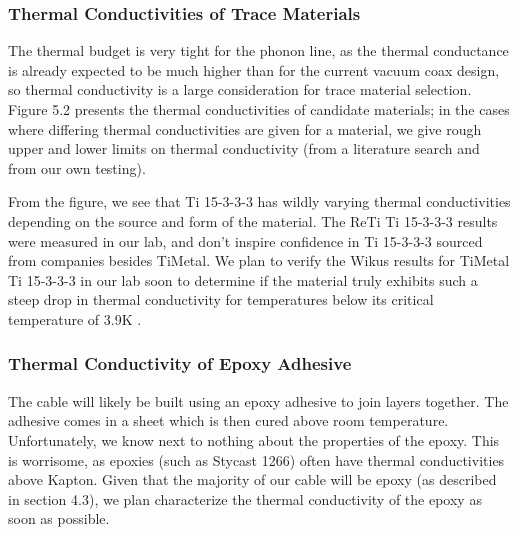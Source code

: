 \documentclass{report}
\begin{document}
\subsubsection{Thermal Conductivities of Trace Materials}

The thermal budget is very tight for the phonon line, as the thermal conductance is already expected to be much higher than for the current vacuum coax design, so thermal conductivity is a large consideration for trace material selection. Figure 5.2 presents the thermal conductivities of candidate materials; in the cases where differing thermal conductivities are given for a material, we give rough upper and lower limits on thermal conductivity (from a literature search and from our own testing).

From the figure, we see that Ti 15-3-3-3 has wildly varying thermal conductivities depending on the source and form of the material. The ReTi Ti 15-3-3-3 results were measured in our lab, and don't inspire confidence in Ti 15-3-3-3 sourced from companies besides TiMetal. We plan to verify the Wikus results for TiMetal Ti 15-3-3-3 in our lab soon to determine if the material truly exhibits such a steep drop in thermal conductivity for temperatures below its critical temperature of 3.9K \cite{wik}.

\subsubsection{Thermal Conductivity of Epoxy Adhesive}

The cable will likely be built using an epoxy adhesive to join layers together. The adhesive comes in a sheet which is then cured above room temperature. Unfortunately, we know next to nothing about the properties of the epoxy. This is worrisome, as epoxies (such as Stycast 1266) often have thermal conductivities above Kapton. Given that the majority of our cable will be epoxy (as described in section 4.3), we plan characterize the thermal conductivity of the epoxy as soon as possible.
\end{document}
